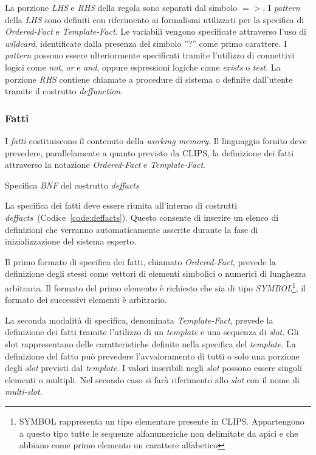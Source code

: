 La porzione \emph{LHS} e \emph{RHS} della regola sono separati dal simbolo $=>$. I \emph{pattern} della \emph{LHS} sono definiti con riferimento ai formalismi utilizzati per la specifica di \emph{Ordered-Fact} e \emph{Template-Fact}. Le variabili vengono specificate attraverso l'uso di \emph{wildcard}, identificate dalla presenza del simbolo ''?'' come primo carattere. I \emph{pattern} possono essere ulteriormente specificati tramite l'utilizzo di connettivi logici come \emph{not}, \emph{or} e \emph{and}, oppure espressioni logiche come \emph{exists} o \emph{test}.
La porzione \emph{RHS} contiene chiamate a procedure di sistema o definite dall'utente tramite il costrutto \emph{deffunction}.


\subsubsection{Fatti}\label{par:linguaggio-fatti}

I \emph{fatti} costituiscono il contenuto della \emph{working memory}. Il linguaggio fornito deve prevedere, parallelamente a quanto previsto da CLIPS, la definizione dei fatti attraverso la notazione \emph{Ordered-Fact} e \emph{Template-Fact}.

\begin{program}
\caption{Specifica \emph{BNF} del costrutto \emph{deffacts}}\label{code:deffacts}
\end{program}


La specifica dei fatti deve essere riunita all'interno di costrutti \emph{deffacts}~(Codice~\ref{code:deffacts}). Questo consente di inserire un elenco di definizioni che verranno automaticamente asserite durante la fase di inizializzazione del sistema esperto.

Il primo formato di specifica dei fatti, chiamato \emph{Ordered-Fact}, prevede la definizione degli stessi come vettori di elementi simbolici o numerici di lunghezza arbitraria. Il formato del primo elemento è richiesto che sia di tipo \emph{SYMBOL}\footnote{SYMBOL rappresenta un tipo elementare presente in CLIPS. Appartengono a questo tipo tutte le sequenze alfanumeriche non delimitate da apici e che abbiano come primo elemento un carattere alfabetico}, il formato dei successivi elementi è arbitrario.

La seconda modalità di specifica, denominata \emph{Template-Fact}, prevede la definizione dei fatti tramite l'utilizzo di un \emph{template} e una sequenza di \emph{slot}. Gli slot rappresentano delle caratteristiche definite nella specifica del \emph{template}.
La definizione del fatto può prevedere l'avvaloramento di tutti o solo una porzione degli \emph{slot} previsti dal \emph{template}.
I valori inseribili negli \emph{slot} possono essere singoli elementi o multipli. Nel secondo caso si farà riferimento allo \emph{slot} con il nome di \emph{multi-slot}.

